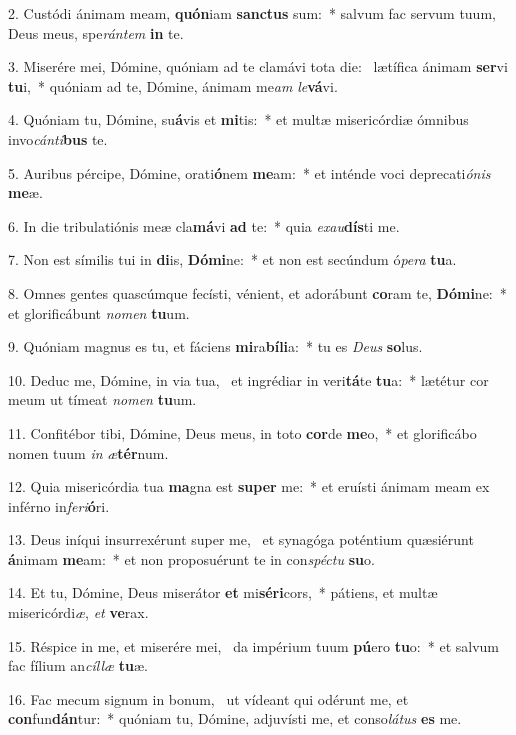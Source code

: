 2. Custódi ánimam meam, \textbf{quón}iam \textbf{sanc}\textbf{tus} sum:~*  salvum fac servum tuum, Deus meus, spe\textit{rán}\textit{tem} \textbf{in} te.\

3. Miserére mei, Dómine, quóniam ad te clamávi tota die: \dag\  lætífica ánimam \textbf{ser}vi \textbf{tu}i,~*  quóniam ad te, Dómine, ánimam me\textit{am} \textit{le}\textbf{vá}vi.\

4. Quóniam tu, Dómine, su\textbf{á}vis et \textbf{mi}tis:~*  et multæ misericórdiæ ómnibus invo\textit{cán}\textit{ti}\textbf{bus} te.\

5. Auribus pércipe, Dómine, orati\textbf{ó}nem \textbf{me}am:~*  et inténde voci deprecati\textit{ó}\textit{nis} \textbf{me}æ.\

6. In die tribulatiónis meæ cla\textbf{má}vi \textbf{ad} te:~*  quia \textit{ex}\textit{au}\textbf{dís}ti me.\

7. Non est símilis tui in \textbf{di}is, \textbf{Dó}\textbf{mi}ne:~*  et non est secúndum ó\textit{pe}\textit{ra} \textbf{tu}a.\

8. Omnes gentes quascúmque fecísti, vénient, et adorábunt \textbf{co}ram te, \textbf{Dó}\textbf{mi}ne:~*  et glorificábunt \textit{no}\textit{men} \textbf{tu}um.\

9. Quóniam magnus es tu, et fáciens \textbf{mi}ra\textbf{bí}\textbf{li}a:~*  tu es \textit{De}\textit{us} \textbf{so}lus.\

10. Deduc me, Dómine, in via tua, \dag\  et ingrédiar in veri\textbf{tá}te \textbf{tu}a:~*  lætétur cor meum ut tímeat \textit{no}\textit{men} \textbf{tu}um.\

11. Confitébor tibi, Dómine, Deus meus, in toto \textbf{cor}de \textbf{me}o,~*  et glorificábo nomen tuum \textit{in} \textit{æ}\textbf{tér}num.\

12. Quia misericórdia tua \textbf{ma}gna est \textbf{su}\textbf{per} me:~*  et eruísti ánimam meam ex inférno in\textit{fe}\textit{ri}\textbf{ó}ri.\

13. Deus iníqui insurrexérunt super me, \dag\  et synagóga poténtium quæsiérunt \textbf{á}nimam \textbf{me}am:~*  et non proposuérunt te in con\textit{spéc}\textit{tu} \textbf{su}o.\

14. Et tu, Dómine, Deus miserátor \textbf{et} mi\textbf{sé}\textbf{ri}cors,~*  pátiens, et multæ misericórdi\textit{æ}, \textit{et} \textbf{ve}rax.\

15. Réspice in me, et miserére mei, \dag\  da impérium tuum \textbf{pú}ero \textbf{tu}o:~*  et salvum fac fílium an\textit{cíl}\textit{læ} \textbf{tu}æ.\

16. Fac mecum signum in bonum, \dag\  ut vídeant qui odérunt me, et \textbf{con}fun\textbf{dán}tur:~*  quóniam tu, Dómine, adjuvísti me, et conso\textit{lá}\textit{tus} \textbf{es} me.\

